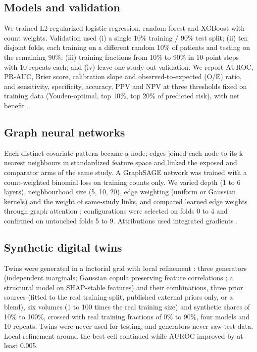 \documentclass[journal]{IEEEtran}
\begin{document}
\subsection{Models and validation}\label{models-and-validation}

We trained L2-regularized logistic regression, random forest and XGBoost
\cite{chen2016} with count weights. Validation used (i) a single 10\%
training / 90\% test split; (ii) ten disjoint folds, each training on a
different random 10\% of patients and testing on the remaining 90\%;
(iii) training fractions from 10\% to 90\% in 10-point steps with 10
repeats each; and (iv) leave-one-study-out validation. We report AUROC,
PR-AUC, Brier score, calibration slope and observed-to-expected (O/E)
ratio, and sensitivity, specificity, accuracy, PPV and NPV at three
thresholds fixed on training data (Youden-optimal, top 10\%, top 20\% of
predicted risk), with net benefit \cite{vickers2006}.

\subsection{Graph neural networks}\label{graph-neural-networks}

Each distinct covariate pattern became a node; edges joined each node to
its k nearest neighbours in standardized feature space and linked the
exposed and comparator arms of the same study. A GraphSAGE network
\cite{hamilton2017} was trained with a count-weighted binomial loss on
training counts only. We varied depth (1 to 6 layers), neighbourhood
size (5, 10, 20), edge weighting (uniform or Gaussian kernels) and the
weight of same-study links, and compared learned edge weights through
graph attention \cite{velickovic2018}; configurations were selected on
folds 0 to 4 and confirmed on untouched folds 5 to 9. Attributions used
integrated gradients \cite{sundararajan2017}.

\subsection{Synthetic digital twins}\label{synthetic-digital-twins}

Twins were generated in a factorial grid \cite{montgomery2017} with
local refinement \cite{bergstra2012}: three generators (independent
marginals; Gaussian copula preserving feature correlations
\cite{patki2016}; a structural model on SHAP-stable features) and their
combinations, three prior sources (fitted to the real training split,
published external priors only, or a blend), six volumes (1 to 100 times
the real training size) and synthetic shares of 10\% to 100\%, crossed
with real training fractions of 0\% to 90\%, four models and 10 repeats.
Twins were never used for testing, and generators never saw test data.
Local refinement around the best cell continued while AUROC improved by
at least 0.005.
\end{document}
